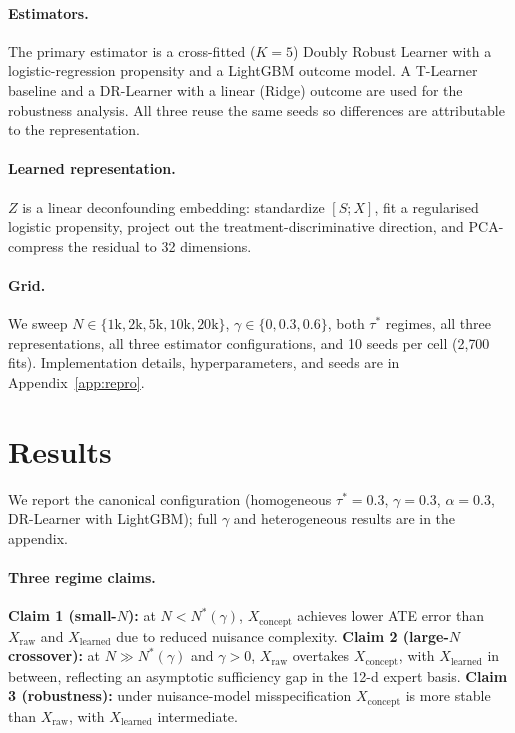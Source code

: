 \documentclass{article}
\begin{document}
\paragraph{Estimators.}
The primary estimator is a cross-fitted ($K=5$) Doubly Robust
Learner\cite{chernozhukov2018double} with a logistic-regression propensity and
a LightGBM outcome model. A T-Learner baseline and a DR-Learner with a linear
(Ridge) outcome are used for the robustness analysis. All three reuse the same
seeds so differences are attributable to the representation.

\paragraph{Learned representation.}
$Z$ is a linear deconfounding embedding\cite{kuang2020information,deconfoundingScores}:
standardize $[S;X]$, fit a regularised logistic propensity, project out the
treatment-discriminative direction, and PCA-compress the residual to 32
dimensions.

\paragraph{Grid.}
We sweep $N\in\{1\text{k},2\text{k},5\text{k},10\text{k},20\text{k}\}$,
$\gamma\in\{0,0.3,0.6\}$, both $\tau^*$ regimes, all three representations,
all three estimator configurations, and 10 seeds per cell (2{,}700 fits).
Implementation details, hyperparameters, and seeds are in
Appendix~\ref{app:repro}.

\section{Results}
\label{sec:results}

We report the canonical configuration (homogeneous $\tau^*=0.3$, $\gamma=0.3$,
$\alpha=0.3$, DR-Learner with LightGBM); full $\gamma$ and heterogeneous
results are in the appendix.

\paragraph{Three regime claims.}
\textbf{Claim 1 (small-$N$):} at $N<N^*(\gamma)$, $X_{\text{concept}}$ achieves
lower ATE error than $X_{\text{raw}}$ and $X_{\text{learned}}$ due to reduced
nuisance complexity. \textbf{Claim 2 (large-$N$ crossover):} at
$N\gg N^*(\gamma)$ and $\gamma>0$, $X_{\text{raw}}$ overtakes
$X_{\text{concept}}$, with $X_{\text{learned}}$ in between, reflecting an
asymptotic sufficiency gap in the 12-d expert basis.
\textbf{Claim 3 (robustness):} under nuisance-model misspecification
$X_{\text{concept}}$ is more stable than $X_{\text{raw}}$, with
$X_{\text{learned}}$ intermediate.
\end{document}
